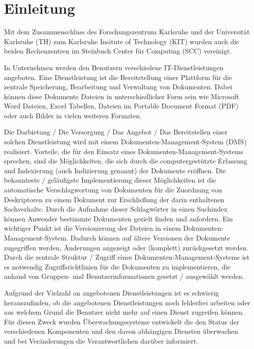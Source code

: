 \section{Einleitung}
Mit dem Zusammenschluss des Forschungszentrum Karlsruhe und der Universität Karlsruhe (TH) zum Karlsruhe Insitute of Technology (KIT) wurden auch die beiden Rechenzentren im Steinbuch Center für Computing (SCC) vereinigt.

In Unternehmen werden den Benutzern verschiedene IT-Dienstleistungen angeboten.
Eine Dienstleistung ist die Bereitstellung einer Plattform für die zentrale Speicherung, Bearbeitung und Verwaltung von Dokumenten.
Dabei können diese Dokumente Dateien in unterschiedlicher Form sein wie Microsoft Word Dateien, Excel Tabellen, Dateien im Portable Document Format (\gls{PDF}) oder auch Bilder in vielen weiteren Formaten.

Die Darbietung / Die Versorgung / Das Angebot / Das Bereitstellen einer solchen Dienstleistung wird mit einem Dokumenten-Management-System (\gls{DMS}) realisiert.
Vorteile, die für den Einsatz eines Dokumenten-Management-Systems sprechen, sind die Möglichkeiten, die sich durch die computergestützte Erfassung und Indexierung (auch Indizierung genannt) der Dokumente eröffnen.
Die bekannteste / geläufigste Implementierung dieser Möglichkeiten ist die automatische Verschlagwortung von Dokumenten für die Zuordnung von Deskriptoren zu einem Dokument zur Erschließung der darin enthaltenen Sachverhalte.
Durch die Aufnahme dieser Schlagwörter in einen Suchindex können Anwender bestimmte Dokumenten gezielt finden und anfordern.
Ein wichtiger Punkt ist die Versionierung der Dateien in einem Dokumenten-Management-System.
Dadurch können auf ältere Versionen der Dokumente zugegriffen werden, Änderungen angezeigt oder (komplett) zurückgesetzt werden.
Durch die zentrale Struktur / Zugriff eines Dokumenten-Management-Systems ist es notwendig Zugriffsrichtlinien für die Dokumenten zu implementieren, die anhand von Gruppen- und Benutzerinformationen gesetzt / ausgewählt werden.

Aufgrund der Vielzahl an angebotenen Dienstleistungen ist es schwierig herauszufinden, ob die angebotenen Dienstleistungen noch fehlerfrei arbeiten oder aus welchem Grund die Benutzer nicht mehr auf einen Dienst zugreifen können.
Für diesen Zweck wurden Überwachungssysteme entwickelt die den Status der verschiedenen Komponenten und den davon abhängigen Diensten überwachen und bei Veränderungen die Verantwortlichen darüber informiert.

